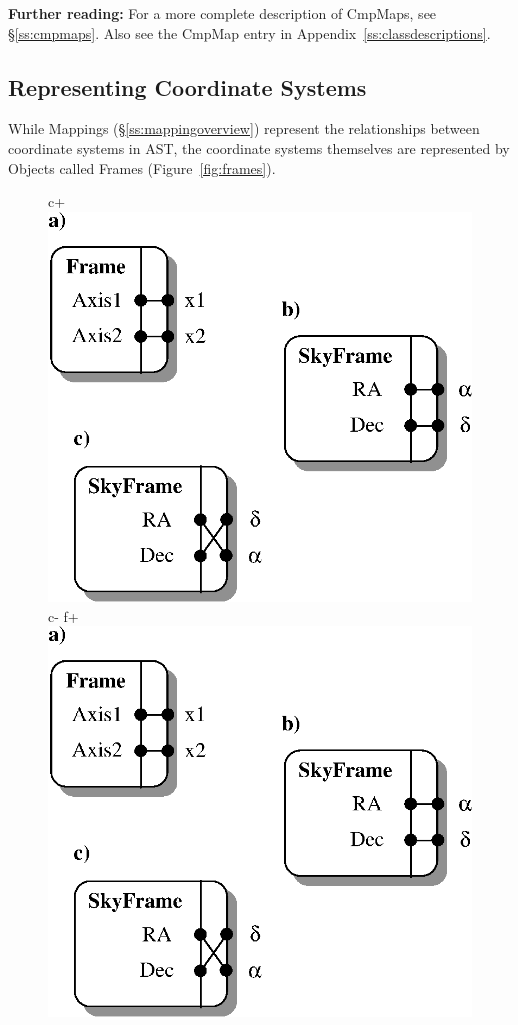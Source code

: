 \documentclass[twoside,11pt]{article}
\newenvironment{latexonly}{}{}
\newcommand{\appref}[1]{Appendix~\ref{#1}}
\newcommand{\secref}[1]{\S\ref{#1}}
\newcommand{\appref}[1]{\ref{#1}}
\newcommand{\secref}[1]{\ref{#1}}
\begin{document}
{\bf{Further reading:}} For a more complete description of CmpMaps,
see \secref{ss:cmpmaps}. Also see the CmpMap entry in
\appref{ss:classdescriptions}.

\subsection{Representing Coordinate Systems}

\begin{latexonly}
   While Mappings (\secref{ss:mappingoverview}) represent the
   relationships between coordinate systems in AST, the coordinate
   systems themselves are represented by Objects called Frames
   (Figure~\ref{fig:frames}).
   \begin{figure}
   \begin{center}
c+
   \includegraphics[scale=0.75]{sun211_figures/frames.eps}
c-
f+
   \includegraphics[scale=0.75]{sun210_figures/frames.eps}

\end{center}
\end{figure}
\end{latexonly}
\end{document}
